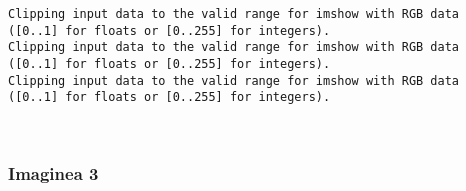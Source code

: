 \documentclass[11pt]{article}
\begin{document}
    \begin{Verbatim}[commandchars=\\\{\}]
Clipping input data to the valid range for imshow with RGB data ([0..1] for floats or [0..255] for integers).
Clipping input data to the valid range for imshow with RGB data ([0..1] for floats or [0..255] for integers).
Clipping input data to the valid range for imshow with RGB data ([0..1] for floats or [0..255] for integers).

    \end{Verbatim}

    \begin{center}
    \end{center}
    { \hspace*{\fill} \\}
    
    \subsubsection{Imaginea 3}\label{imaginea-3}
\end{document}
